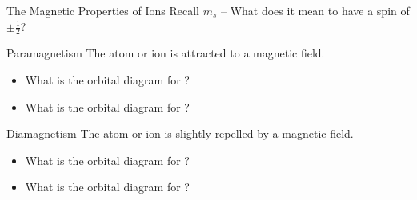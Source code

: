 \documentclass[notes=show]{beamer}
\begin{document}
\begin{frame}[t]{The Magnetic Properties of Ions}
	Recall $m_s$ -- What does it mean to have a spin of $\pm\frac{1}{2}$?
\end{frame}

\begin{frame}[t]{Paramagnetism}
	The atom or ion is \alert{attracted} to a magnetic field.
	\begin{itemize}
		\item What is the orbital diagram for ?

			\vfill

		\item What is the orbital diagram for ?

			\vfill
	\end{itemize}

\end{frame}

\begin{frame}[t]{Diamagnetism}
	The atom or ion is \alert{slightly repelled} by a magnetic field.
	\begin{itemize}
		\item What is the orbital diagram for ?

			\vfill

		\item What is the orbital diagram for ?

			\vfill
	\end{itemize}


\end{frame}
\end{document}
